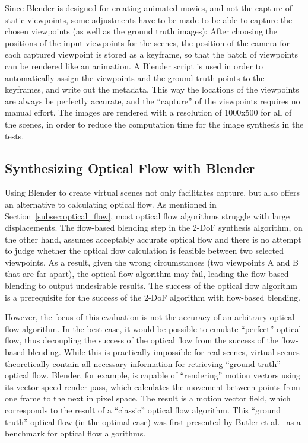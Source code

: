 Since Blender is designed for creating animated movies, and not the capture of static viewpoints, some adjustments have to be made to be able to capture the chosen viewpoints (as well as the ground truth images): After choosing the positions of the input viewpoints for the scenes, the position of the camera for each captured viewpoint is stored as a keyframe, so that the batch of viewpoints can be rendered like an animation. A Blender script is used in order to automatically assign the viewpoints and the ground truth points to the keyframes, and write out the metadata. This way the locations of the viewpoints are always be perfectly accurate, and the ``capture'' of the viewpoints requires no manual effort. The images are rendered with a resolution of 1000x500 for all of the scenes, in order to reduce the computation time for the image synthesis in the tests.

\subsection{Synthesizing Optical Flow with Blender} \label{subsec:gt_of}
Using Blender to create virtual scenes not only facilitates capture, but also offers an alternative to calculating optical flow. As mentioned in Section~\ref{subsec:optical_flow}, most optical flow algorithms struggle with large displacements.
The flow-based blending step in the 2-DoF synthesis algorithm, on the other hand, assumes acceptably accurate optical flow and there is no attempt to judge whether the optical flow calculation is feasible between two selected viewpoints.
As a result, given the wrong circumstances (two viewpoints A and B that are far apart), the optical flow algorithm may fail, leading the flow-based blending to output undesirable results. The success of the optical flow algorithm is a prerequisite for the success of the 2-DoF algorithm with flow-based blending.

However, the focus of this evaluation is not the accuracy of an arbitrary optical flow algorithm. In the best case, it would be possible to emulate ``perfect'' optical flow, thus decoupling the success of the optical flow from the success of the flow-based blending. While this is practically impossible for real scenes, virtual scenes theoretically contain all necessary information for retrieving ``ground truth'' optical flow. Blender, for example, is capable of ``rendering'' motion vectors using its vector speed render pass, which calculates the movement between points from one frame to the next in pixel space. The result is a motion vector field, which corresponds to the result of a ``classic'' optical flow algorithm. This ``ground truth'' optical flow (in the optimal case) was first presented by Butler et al.\ \cite{sintel} as a benchmark for optical flow algorithms.


